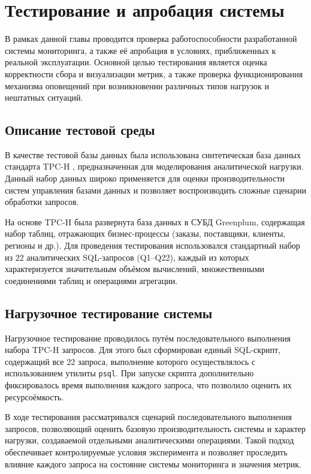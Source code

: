 \chapter{Тестирование и апробация системы} \label{ch3}

В рамках данной главы проводится проверка работоспособности разработанной системы мониторинга, а также её апробация в условиях, приближенных к реальной эксплуатации. Основной целью тестирования является оценка корректности сбора и визуализации метрик, а также проверка функционирования механизма оповещений при возникновении различных типов нагрузок и нештатных ситуаций.

\section{Описание тестовой среды} \label{ch3:sec1}

В качестве тестовой базы данных была использована синтетическая база данных стандарта TPC-H \cite{tcph}, предназначенная для моделирования аналитической нагрузки. Данный набор данных широко применяется для оценки производительности систем управления базами данных и позволяет воспроизводить сложные сценарии обработки запросов.

На основе TPC-H была развернута база данных в СУБД Greenplum, содержащая набор таблиц, отражающих бизнес-процессы (заказы, поставщики, клиенты, регионы и др.). Для проведения тестирования использовался стандартный набор из 22 аналитических SQL-запросов (Q1–Q22), каждый из которых характеризуется значительным объёмом вычислений, множественными соединениями таблиц и операциями агрегации.

\section{Нагрузочное тестирование системы}  \label{ch3:sec2}

Нагрузочное тестирование проводилось путём последовательного выполнения набора TPC-H запросов. Для этого был сформирован единый SQL-скрипт, содержащий все 22 запроса, выполнение которого осуществлялось с использованием утилиты \texttt{psql}. При запуске скрипта дополнительно фиксировалось время выполнения каждого запроса, что позволило оценить их ресурсоёмкость.

В ходе тестирования рассматривался сценарий последовательного выполнения запросов, позволяющий оценить базовую производительность системы и характер нагрузки, создаваемой отдельными аналитическими операциями. Такой подход обеспечивает контролируемые условия эксперимента и позволяет проследить влияние каждого запроса на состояние системы мониторинга и значения метрик.

